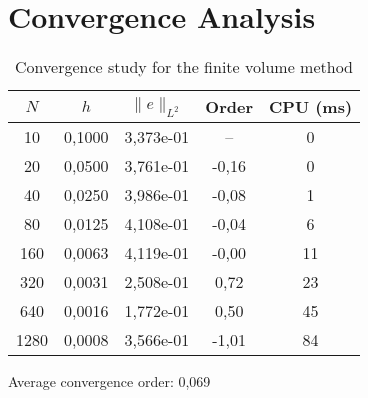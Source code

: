 \documentclass{article}
\begin{document}
\section{Convergence Analysis}

\begin{table}[htbp]
\centering
\caption{Convergence study for the finite volume method}
\begin{tabular}{ccccc}
\toprule
$N$ & $h$ & $\|e\|_{L^2}$ & Order & CPU (ms) \\
\midrule
10 & 0,1000 & 3,373e-01 & -- & 0 \\
20 & 0,0500 & 3,761e-01 & -0,16 & 0 \\
40 & 0,0250 & 3,986e-01 & -0,08 & 1 \\
80 & 0,0125 & 4,108e-01 & -0,04 & 6 \\
160 & 0,0063 & 4,119e-01 & -0,00 & 11 \\
320 & 0,0031 & 2,508e-01 & 0,72 & 23 \\
640 & 0,0016 & 1,772e-01 & 0,50 & 45 \\
1280 & 0,0008 & 3,566e-01 & -1,01 & 84 \\
\bottomrule
\end{tabular}
\end{table}

Average convergence order: 0,069
\end{document}
